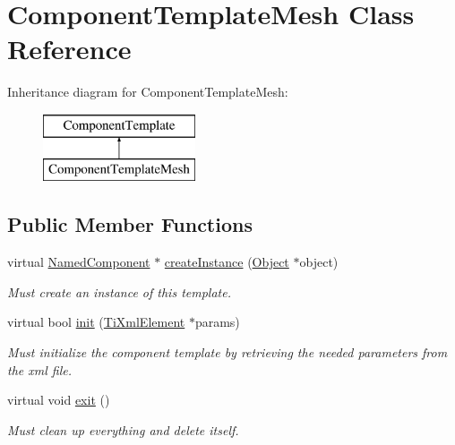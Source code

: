 \hypertarget{classComponentTemplateMesh}{
\section{\-Component\-Template\-Mesh \-Class \-Reference}
\label{d5/d29/classComponentTemplateMesh}
}
\-Inheritance diagram for \-Component\-Template\-Mesh\-:\begin{figure}[H]
\begin{center}
\leavevmode
\includegraphics[height=2.000000cm]{d5/d29/classComponentTemplateMesh}
\end{center}
\end{figure}
\subsection*{\-Public \-Member \-Functions}
\begin{DoxyCompactItemize}
\item 
\hypertarget{classComponentTemplateMesh_aab5ea272aebf59cb09a68c56988bd04d}{
virtual \hyperlink{classNamedComponent}{\-Named\-Component} $\ast$ \hyperlink{classComponentTemplateMesh_aab5ea272aebf59cb09a68c56988bd04d}{create\-Instance} (\hyperlink{classObject}{\-Object} $\ast$object)}
\label{d5/d29/classComponentTemplateMesh_aab5ea272aebf59cb09a68c56988bd04d}

\begin{DoxyCompactList}\small\item\em \-Must create an instance of this template. \end{DoxyCompactList}\item 
\hypertarget{classComponentTemplateMesh_a869d65e53166719128020fea8c98fc7d}{
virtual bool \hyperlink{classComponentTemplateMesh_a869d65e53166719128020fea8c98fc7d}{init} (\hyperlink{classTiXmlElement}{\-Ti\-Xml\-Element} $\ast$params)}
\label{d5/d29/classComponentTemplateMesh_a869d65e53166719128020fea8c98fc7d}

\begin{DoxyCompactList}\small\item\em \-Must initialize the component template by retrieving the needed parameters from the xml file. \end{DoxyCompactList}\item 
\hypertarget{classComponentTemplateMesh_a79d94a35d8be1a579ee1ef996b15593f}{
virtual void \hyperlink{classComponentTemplateMesh_a79d94a35d8be1a579ee1ef996b15593f}{exit} ()}
\label{d5/d29/classComponentTemplateMesh_a79d94a35d8be1a579ee1ef996b15593f}

\begin{DoxyCompactList}\small\item\em \-Must clean up everything and delete itself. \end{DoxyCompactList}\end{DoxyCompactItemize}
